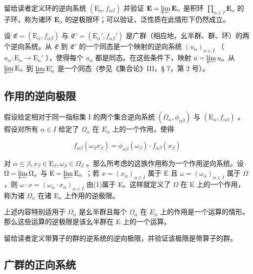 留给读者定义环的逆向系统 \((\mathrm{E}_{\alpha}, f_{\alpha \beta})\) 并验证 \(\mathbf{E} = \varprojlim \mathbf{E}_{\alpha}\) 是积环 \(\prod_{\alpha \in I} \mathbf{E}_{\alpha}\) 的子环，称为诸环 \(\mathbf{E}_{\alpha}\) 的逆极限环；可以验证，泛性质在此情形下仍然成立。

设 \(\mathfrak{E} = (\mathrm{E}_{\alpha}, f_{\alpha\beta})\) 与 \(\mathfrak{E}' = (\mathrm{E}_{\alpha}', f_{\alpha\beta}')\) 是广群（相应地，幺半群、群、环）的两个逆向系统。从 \(\mathfrak{E}\) 到 \(\mathfrak{E}'\) 的一个同态是一个映射的逆向系统 \((u_{\alpha})_{\alpha \in I}\) （ \(u_{\alpha}: \mathrm{E}_{\alpha} \to \mathrm{E}_{\alpha}'\) ），使得每个 \(u_{\alpha}\) 都是同态。在这些条件下，映射 \(u = \varprojlim u_{\alpha}\) 从 \(\varprojlim \mathrm{E}_{\alpha}\) 到 \(\varprojlim \mathrm{E}_{\alpha}'\) 是一个同态（参见《集合论》III，§ 7，第 2 号）。

\subsection{作用的逆向极限}

假设给定相对于同一指标集 I 的两个集合逆向系统 \((\Omega_{\alpha}, \phi_{\alpha\beta})\) 与 \((\mathrm{E}_{\alpha}, f_{\alpha\beta})\) 。假设对所有 \(\alpha \in I\) 给定了 \(\Omega_{\alpha}\) 在 \(E_{\alpha}\) 上的一个作用，使得

\[
f _ {\alpha \beta} (\omega_ {\beta} x _ {\beta}) = \phi_ {\alpha \beta} (\omega_ {\beta}) \cdot f _ {\alpha \beta} (x _ {\beta})\tag{1}
\]

对 \(\alpha \leqslant \beta, x_{\beta} \in \mathrm{E}_{\beta}, \omega_{\beta} \in \Omega_{\beta}\) 。那么所考虑的这族作用称为一个作用逆向系统。设 \(\Omega = \varprojlim \Omega_{\alpha}\) 与 \(\mathrm{E} = \varprojlim \mathrm{E}_{\alpha}\) ；若 \(x = (x_{\alpha})_{\alpha \in I}\) 属于 \(\mathrm{E}\) 且 \(\omega = (\omega_{\alpha})_{\alpha \in I}\) 属于 \(\Omega\) ，则 \(\omega \cdot x = (\omega_{\alpha} \cdot x_{\alpha})_{\alpha \in I}\) 由(1)属于 E。这样就定义了 \(\Omega\) 在 E 上的一个作用，称为诸 \(\Omega_{\alpha}\) 在诸 \(\mathrm{E}_{\alpha}\) 上作用的逆极限。

上述内容特别适用于 \(\Omega_{\alpha}\) 是幺半群且每个 \(\Omega_{\alpha}\) 在 \(E_{\alpha}\) 上的作用是一个运算的情形。那么这些运算的逆极限是该幺半群在 E 上的一个运算。

留给读者定义带算子的群的逆系统的逆向极限，并验证该极限是带算子的群。

\subsection{广群的正向系统}

